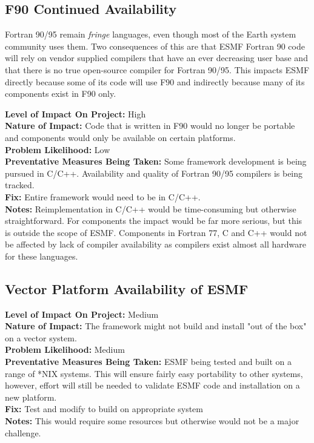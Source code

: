 \documentclass[english]{article}
\newcommand{\sreq}[1]{\subsection{\hspace{.2in}#1}}
\newenvironment
{reqlist}
{\begin{list} {} {} \rm \item[]}
{\end{list}}
\begin{document}
\sreq{F90 Continued Availability}
Fortran 90/95 remain {\it fringe} languages, even though most of the Earth system
community uses them. Two consequences of this are that ESMF Fortran 90 code will
rely on vendor supplied compilers that have an ever decreasing user base and
that there is no true open-source compiler for Fortran 90/95.
This impacts ESMF directly because some of its code will use F90 and
indirectly because many of its components exist in F90 only.
\begin{reqlist}
{\bf Level of Impact On Project:} High \\
{\bf Nature of Impact:} Code that is written in F90 would no longer be portable
and components would only be available on certain platforms. \\
{\bf Problem Likelihood:} Low\\
{\bf Preventative Measures Being Taken:} Some framework development is being pursued in C/C++.
Availability and quality of Fortran 90/95 compilers
is being tracked.\\
{\bf Fix:} Entire framework would need to be in C/C++.\\
{\bf Notes:} Reimplementation in C/C++ would be time-consuming but
otherwise straightforward. For components the impact would be far more
serious, but this is outside the scope of ESMF.
Components in Fortran 77, C and C++ would not be affected by lack of 
compiler availability as compilers exist almost all hardware for these languages.
\end{reqlist}

\sreq{Vector Platform Availability of ESMF}
\begin{reqlist}
{\bf Level of Impact On Project:} Medium \\
{\bf Nature of Impact:} The framework might not build and install "out of the box"
on a vector system.\\
{\bf Problem Likelihood:} Medium\\
{\bf Preventative Measures Being Taken:} ESMF being tested and built on a range of *NIX systems. This will
ensure fairly easy portability to other systems, however, effort will still be needed 
to validate ESMF code and installation on a new platform. \\
{\bf Fix:} Test and modify to build on appropriate system\\
{\bf Notes:} This would require some resources but otherwise would not be a major challenge.
\end{reqlist}
\end{document}
